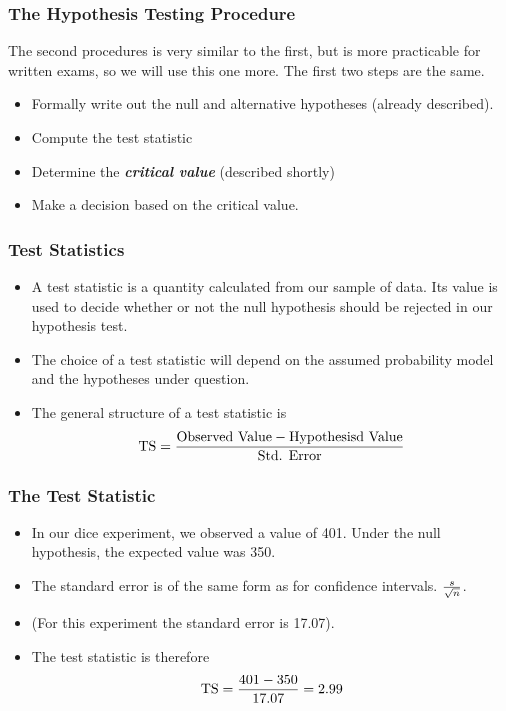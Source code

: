 \begin{frame}
\frametitle{The Hypothesis Testing Procedure }
The second procedures is very similar to the first, but is more practicable for written exams, so we will use this one more. The first two steps are the same.

\begin{itemize}
\item Formally write out the null and alternative hypotheses (already described).
\item Compute the test statistic
\item Determine the \emph{\textbf{critical value}} (described shortly)
\item Make a decision based on the critical value.
\end{itemize}
\end{frame}
\begin{frame}


\frametitle{Test Statistics}
\begin{itemize}
\item A test statistic is a quantity calculated from our sample of data. Its value is used to decide whether or not the null hypothesis should be rejected in our hypothesis test.
\item The choice of a test statistic will depend on the assumed probability model and the hypotheses under question.
    \item The general structure of a test statistic is
\[ \mbox{TS}  = {\mbox{Observed Value} - \mbox{Hypothesisd Value}  \over \mbox{Std. Error}}\]
\end{itemize}
\end{frame}
\begin{frame}
\frametitle{The Test Statistic}
\begin{itemize}

\item In our dice experiment, we observed a value of 401. Under the null hypothesis, the expected value was 350.
\item The standard error is of the same form as for confidence intervals. $s \over \sqrt{n}$.
\item (For this experiment the standard error is 17.07).
\item The test statistic is therefore \[ \mbox{TS}  = {401 - 350  \over 17.07} = 2.99 \]
\end{itemize}
\end{frame}

